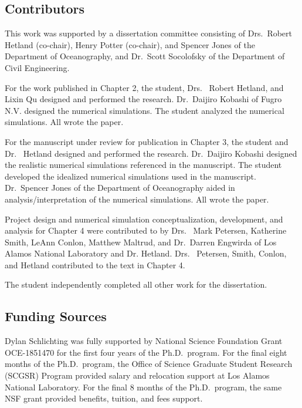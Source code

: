 

\begin{contributors}
\subsection*{Contributors}
This work was supported by a dissertation committee consisting of Drs.~Robert Hetland (co-chair), Henry Potter (co-chair), and Spencer Jones of the Department of Oceanography, and Dr.~Scott  Socolofsky of the Department of Civil Engineering.

For the work published in Chapter 2, the student, Drs.~ Robert Hetland, and Lixin Qu designed and performed the research. Dr.~Daijiro Kobashi of Fugro N.V. designed the numerical simulations. The student analyzed the numerical simulations. All wrote the paper. 

For the manuscript under review for publication in Chapter 3, the student and Dr.~ Hetland designed and performed the research. Dr.~Daijiro Kobashi designed the realistic numerical simulations referenced in the manuscript. The student developed the idealized numerical simulations used in the manuscript. Dr.~Spencer Jones of the Department of Oceanography aided in analysis/interpretation of the numerical simulations. All wrote the paper. 

Project design and numerical simulation conceptualization, development, and analysis for Chapter 4 were contributed to by Drs.~ Mark Petersen, Katherine Smith, LeAnn Conlon, Matthew Maltrud, and Dr.~Darren Engwirda of Los Alamos National Laboratory and Dr. Hetland.  Drs.~ Petersen, Smith, Conlon, and Hetland contributed to the text in Chapter 4. 

The student independently completed all other work for the dissertation.

\subsection*{Funding Sources}
Dylan Schlichting was fully supported by National Science Foundation Grant OCE-1851470 for the first four years of the Ph.D.~program. For the final eight months of the Ph.D.~program, the Office of Science Graduate Student Research (SCGSR) Program provided salary and relocation support at Los Alamos National Laboratory. For the final 8 months of the Ph.D.~program, the same NSF grant provided benefits, tuition, and fees support. 

\end{contributors}